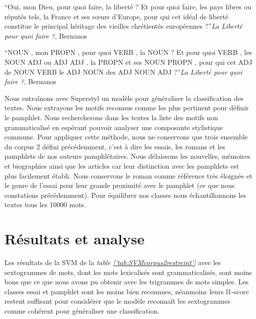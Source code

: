 \enquote{Oui, mon Dieu, pour quoi faire, la liberté ? Et pour quoi faire, les pays libres ou réputés tels, la France et ses sœurs d’Europe, pour qui cet idéal de liberté constitue le principal héritage des vieilles chrétientés européennes ?}\textit{La Liberté pour quoi faire ?}, Bernanos\par

\enquote{NOUN , mon PROPN , pour quoi VERB , la NOUN ? Et pour quoi VERB , les NOUN ADJ ou ADJ ADJ , la PROPN et ses NOUN PROPN , pour qui cet ADJ de NOUN VERB le ADJ NOUN des ADJ NOUN ADJ ?}\textit{La Liberté pour quoi faire ?}, Bernanos\par

Nous entraînons avec Superstyl un modèle pour généraliser la classification des textes. Nous extrayons les motifs reconnus comme les plus pertinent pour définir le pamphlet. Nous rechercherons dans les textes la liste des motifs non grammaticalisé en espérant pouvoir analyser une composante stylistique commune.
Pour appliquer cette méthode, nous ne conservons que trois ensemble du corpus 2 défini précédemment, c'est à dire les essais, les romans et les pamphlets de nos auteurs pamphlétaires. Nous délaissons les nouvelles, mémoires et biographies ainsi que les articles car leur distinction avec les pamphlets est plus facilement établi. Nous conservons le roman comme référence très éloignée et le genre de l'essai pour leur grande proximité avec le pamphlet (ce que nous constations précédemment). Pour équilibrer nos classes nous échantillonnons les textes tous les 10000 mots.


\section{Résultats et analyse}

Les résultats de la SVM de la \textit{table \ref{'tab:SVMcorpus2restreint'}} avec les sextogrammes de mots, dont les mots lexicalisés sont grammaticalisés, sont moins bons que ce que nous avons pu obtenir avec les trigrammes de mots simples. Les classes essai et pamphlet sont les moins bien reconnues, néanmoins leurs f1-score restent suffisant pour considérer que le modèle reconnaît les sextogrammes comme cohérent pour généraliser une classification.

